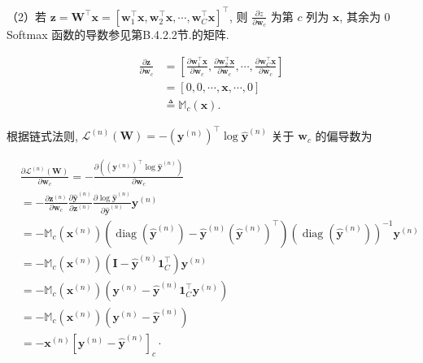 \documentclass[10pt]{article}
\begin{document}
（2）若 $\boldsymbol{z}=\boldsymbol{W}^{\top} \boldsymbol{x}=\left[\boldsymbol{w}_{1}^{\top} \boldsymbol{x}, \boldsymbol{w}_{2}^{\top} \boldsymbol{x}, \cdots, \boldsymbol{w}_{C}^{\top} \boldsymbol{x}\right]^{\top}$, 则 $\frac{\partial z}{\partial \boldsymbol{w}_{c}}$ 为第 $c$ 列为 $\boldsymbol{x}$, 其余为 0 Softmax 函数的导数参见第B.4.2.2节.的矩阵.


\begin{align*}
\frac{\partial \boldsymbol{z}}{\partial \boldsymbol{w}_{c}} & =\left[\frac{\partial \boldsymbol{w}_{1}^{\top} \boldsymbol{x}}{\partial \boldsymbol{w}_{c}}, \frac{\partial \boldsymbol{w}_{2}^{\top} \boldsymbol{x}}{\partial \boldsymbol{w}_{c}}, \cdots, \frac{\partial \boldsymbol{w}_{C}^{\top} \boldsymbol{x}}{\partial \boldsymbol{w}_{c}}\right]  \tag{3.41}\\
& =[0,0, \cdots, \boldsymbol{x}, \cdots, 0]  \tag{3.42}\\
& \triangleq \mathbb{M}_{c}(\boldsymbol{x}) . \tag{3.43}
\end{align*}


根据链式法则, $\mathcal{L}^{(n)}(\boldsymbol{W})=-\left(\boldsymbol{y}^{(n)}\right)^{\top} \log \hat{\boldsymbol{y}}^{(n)}$ 关于 $\boldsymbol{w}_{c}$ 的偏导数为


\begin{align*}
& \frac{\partial \mathcal{L}^{(n)}(\boldsymbol{W})}{\partial \boldsymbol{w}_{c}}=-\frac{\partial\left(\left(\boldsymbol{y}^{(n)}\right)^{\top} \log \hat{\boldsymbol{y}}^{(n)}\right)}{\partial \boldsymbol{w}_{c}}  \tag{3.44}\\
& =-\frac{\partial \boldsymbol{z}^{(n)}}{\partial \boldsymbol{w}_{c}} \frac{\partial \hat{\boldsymbol{y}}^{(n)}}{\partial \boldsymbol{z}^{(n)}} \frac{\partial \log \hat{\boldsymbol{y}}^{(n)}}{\partial \hat{\boldsymbol{y}}^{(n)}} \boldsymbol{y}^{(n)}  \tag{3.45}\\
& =-\mathbb{M}_{c}\left(\boldsymbol{x}^{(n)}\right)\left(\operatorname{diag}\left(\hat{\boldsymbol{y}}^{(n)}\right)-\hat{\boldsymbol{y}}^{(n)}\left(\hat{\boldsymbol{y}}^{(n)}\right)^{\top}\right)\left(\operatorname{diag}\left(\hat{\boldsymbol{y}}^{(n)}\right)\right)^{-1} \boldsymbol{y}^{(n)}  \tag{3.46}\\
& =-\mathbb{M}_{c}\left(\boldsymbol{x}^{(n)}\right)\left(\boldsymbol{I}-\hat{\boldsymbol{y}}^{(n)} \mathbf{1}_{C}^{\top}\right) \boldsymbol{y}^{(n)}  \tag{3.47}\\
& =-\mathbb{M}_{c}\left(\boldsymbol{x}^{(n)}\right)\left(\boldsymbol{y}^{(n)}-\hat{\boldsymbol{y}}^{(n)} \mathbf{1}_{C}^{\top} \boldsymbol{y}^{(n)}\right)  \tag{3.48}\\
& =-\mathbb{M}_{c}\left(\boldsymbol{x}^{(n)}\right)\left(\boldsymbol{y}^{(n)}-\hat{\boldsymbol{y}}^{(n)}\right)  \tag{3.49}\\
& =-\boldsymbol{x}^{(n)}\left[\boldsymbol{y}^{(n)}-\hat{\boldsymbol{y}}^{(n)}\right]_{c} \cdot \tag{3.50}
\end{align*}
\end{document}
